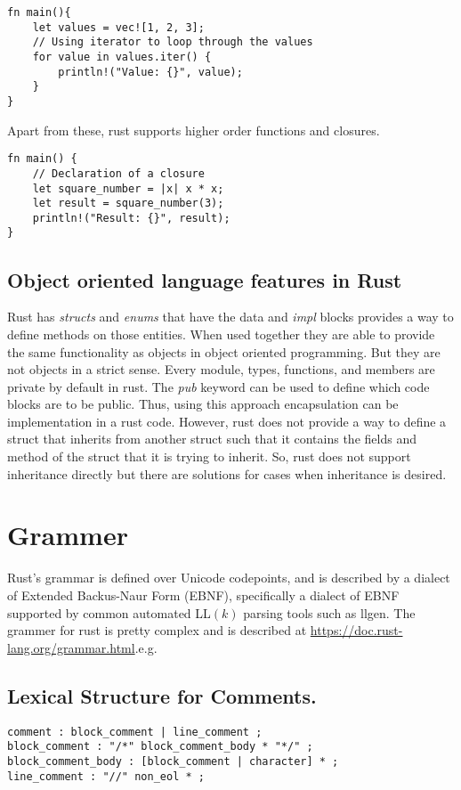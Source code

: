 \documentclass[12pt, titlepage]{article}
\begin{document}
\begin{lstlisting}
fn main(){
    let values = vec![1, 2, 3];
    // Using iterator to loop through the values
    for value in values.iter() {
        println!("Value: {}", value);
    }
}
\end{lstlisting}

Apart from these, rust supports higher order functions and closures.
\begin{lstlisting}
fn main() {
    // Declaration of a closure
    let square_number = |x| x * x;
    let result = square_number(3);
    println!("Result: {}", result);
}
\end{lstlisting}

\subsection{Object oriented language features in Rust}
Rust has \textit{structs} and \textit{enums} that have the data and \textit{impl} blocks provides a way to define
methods on those entities. When used together they are able to provide the same functionality as objects in object oriented programming.
But they are not objects in a strict sense. Every module, types, functions, and members are
private by default in rust. The \textit{pub} keyword can be used to define which code blocks are to be public. Thus, using this
approach encapsulation can be implementation in a rust code. However, rust does not provide a way to define a struct that
inherits from another struct such that it contains the fields and method of the struct that it is trying to inherit. So,
rust does not support inheritance directly but there are solutions for cases when inheritance is desired.

\section{Grammer}
Rust's grammar is defined over Unicode codepoints, and is described by a dialect of Extended Backus-Naur Form (EBNF),
specifically a dialect of EBNF supported by common automated LL$(k)$ parsing tools such as llgen\cite{RustLang}.
The grammer for rust is pretty complex and is described at \href{https://doc.rust-lang.org/grammar.html}{https://doc.rust-lang.org/grammar.html}.e.g.

\subsection{Lexical Structure for Comments.}
\begin{lstlisting}
comment : block_comment | line_comment ;
block_comment : "/*" block_comment_body * "*/" ;
block_comment_body : [block_comment | character] * ;
line_comment : "//" non_eol * ;
\end{lstlisting}
\end{document}
